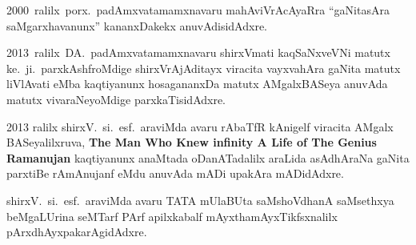 {\rm 2000}~ralilx~porx.~padAmxvatamamxnavaru mahAviVrAcAyaRra ``gaNitasAra saMgarxhavanunx'' kananxDakekx anuvAdisidAdxre.

{\rm 2013}~ralilx~DA.~padAmxvatamamxnavaru shirxVmati kaqSaNxveVNi matutx ke.~ji.~parxkAshf\-roMdige shirxVrAjAditayx viracita vayxvahAra gaNita matutx liVlAvati eMba kaqtiyanunx hosagananxDa matutx AMgalxBASeya anuvAda matutx vivaraNeyoMdige parxkaTisidAdxre.

{\rm 2013} ralilx shirxV.~si.~esf.~araviMda avaru rAbaTfR kAnigelf viracita AMgalx BASeyalilxruva,
{\bf\rm The Man Who Knew infinity A Life of The Genius Ramanujan} kaqtiyanunx anaMtada oDanATadalilx araLida asAdhAraNa gaNita parxtiBe rAmAnujanf eMdu anuvAda mADi upakAra mADidAdxre.

shirxV.~si.~esf.~araviMda avaru TATA mUlaBUta saMshoVdhanA saMsethxya beMgaLUrina seMTarf PArf apilxkabalf mAyxthamAyxTikfsxnalilx pArxdhAyxpakarAgidAdxre.

